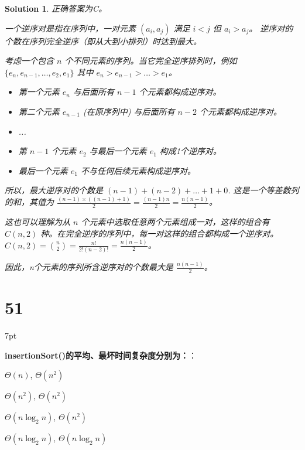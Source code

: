 \documentclass[UTF8]{report}
\newtheorem{solution}{Solution}
\theoremstyle{MyLineTheoremStyle} %
\theoremstyle{MyBlockTheoremStyle} %
\theoremstyle{MySubsubsectionStyle} %
\newenvironment{graybox}{%
        \def\FrameCommand{%
        \hspace{1pt}%
        {\color{gray}\small \vrule width 2pt}%
        {\color{graybox_color}\vrule width 4pt}%
        \colorbox{graybox_color}%
        }%
        \MakeFramed{\advance\hsize-\width\FrameRestore}%
        \noindent\hspace{-4.55pt}%
        \begin{adjustwidth}{}{7pt}%
        \vspace{2pt}\vspace{2pt}%
        }
        {%
        \vspace{2pt}\end{adjustwidth}\endMakeFramed%
        }
\begin{document}
\begin{solution}
正确答案为C。

一个逆序对是指在序列中，一对元素 $(a_i, a_j)$ 满足 $i < j$ 但 $a_i > a_j$。
逆序对的个数在序列完全逆序（即从大到小排列）时达到最大。

考虑一个包含 $n$ 个不同元素的序列。当它完全逆序排列时，例如 $\{e_n, e_{n-1}, \ldots, e_2, e_1\}$ 其中 $e_n > e_{n-1} > \ldots > e_1$。
\begin{itemize}
    \item 第一个元素 $e_n$ 与后面所有 $n-1$ 个元素都构成逆序对。
    \item 第二个元素 $e_{n-1}$ (在原序列中) 与后面所有 $n-2$ 个元素都构成逆序对。
    \item ...
    \item 第 $n-1$ 个元素 $e_2$ 与最后一个元素 $e_1$ 构成1个逆序对。
    \item 最后一个元素 $e_1$ 不与任何后续元素构成逆序对。
\end{itemize}
所以，最大逆序对的个数是 $(n-1) + (n-2) + \ldots + 1 + 0$.
这是一个等差数列的和，其值为 $\frac{(n-1) \times ((n-1) + 1)}{2} = \frac{(n-1)n}{2} = \frac{n(n-1)}{2}$。

这也可以理解为从 $n$ 个元素中选取任意两个元素组成一对，这样的组合有 $C(n, 2)$ 种。在完全逆序的序列中，每一对这样的组合都构成一个逆序对。
$C(n, 2) = \binom{n}{2} = \frac{n!}{2!(n-2)!} = \frac{n(n-1)}{2}$。

因此，n个元素的序列所含逆序对的个数最大是 $\frac{n(n-1)}{2}$。
\end{solution}


\section*{51}

\begin{graybox}
\textbf{insertionSort()的平均、最坏时间复杂度分别为：}：
\begin{circledenum}
    \item $\Theta(n)$, $\Theta(n^2)$
    \item $\Theta(n^2)$, $\Theta(n^2)$
    \item $\Theta(n\log_{2}n)$, $\Theta(n^2)$
    \item $\Theta(n\log_{2}n)$, $\Theta(n\log_{2}n)$
\end{circledenum}
\end{graybox}
\end{document}
